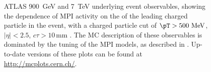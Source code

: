 \begin{figure}[tp]
  \centering
  \caption{ATLAS 900~GeV and 7~TeV underlying event observables, showing
    the dependence of MPI activity on the \pT of the leading charged
    particle in the event, with a charged particle \pT cut of
    $\pT > 500~\text{MeV}$, $|\eta| < 2.5$, $c\tau > 10\,\text{mm}$
    \cite{Aad:2010fh}. The MC description of
    these observables is dominated by the tuning of the MPI models, as
    described in . Up-to-date versions of
    these plots can be found at \url{http://mcplots.cern.ch/}.}
  \label{fig:cmp:mpi-ue-atlas-2}
\end{figure}

